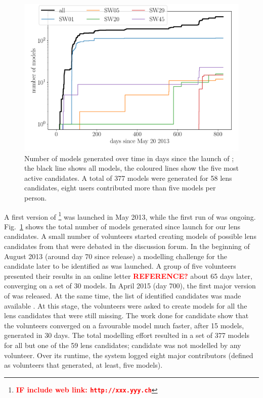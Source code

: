\begin{figure}
  \includegraphics[width=\linewidth]{img/timelapse3}
  \caption{ Number of models generated over time in days since the
    launch of \SpL; the black line shows all models, the coloured
    lines show the five most active candidates. A total of 377 models
    were generated for 58 lens candidates, eight users contributed
    more than five models per person. }
  \label{fig:time}
\end{figure}


A first version of \SpL\footnote{\textcolor{red}{\bf IF include web
    link: {\tt http://xxx.yyy.ch}}} was launched in May 2013, while
the first run of \SW was ongoing.  Fig.~\ref{fig:time} shows the
total number of models generated since launch for our lens candidates.
A small number of volunteers started creating models of possible lens
candidates from \SW that were debated in the discussion forum.  In the
beginning of August 2013 (around day 70 since release) a modelling
challenge for the candidate later to be identified as  was
launched.  A group of five volunteers presented their results in an
online letter \textcolor{red}{\bf REFERENCE?} about 65 days later,
converging on a set of 30 models. In April 2015 (day 700),
the first major version of \SpL was released. At the same time,
the list of identified candidates was made available \citep[as a preprint
  of][]{2016MNRAS.455.1191M}.  At this stage, the volunteers were
asked to create models for all the lens candidates that were still
missing.  The work done for candidate  show that the
volunteers converged on a favourable model much faster, after 15
models, generated in 30 days.  The total modelling effort resulted in
a set of 377 \SpL models for all but one of the 59 \SW lens
candidates; candidate  was not modelled by any volunteer.  Over
its runtime, the system logged eight major contributors (defined as
volunteers that generated, at least, five models).


